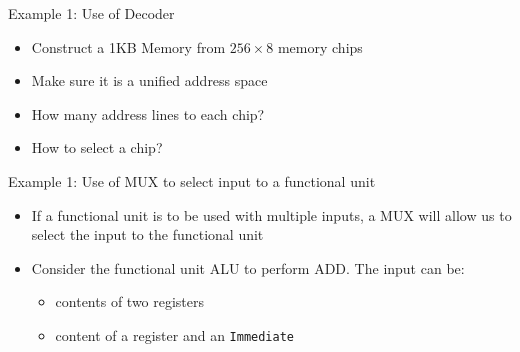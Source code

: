 \begin{frame}{Example 1: Use of Decoder}
    \begin{tcolorbox}[enhanced,attach boxed title to top center={yshift=-3mm,yshifttext=-1mm},
  colback=blue!5!white,colframe=blue!75!black,colbacktitle=blue!80!black,
  title=Think About It,fonttitle=\bfseries,
  boxed title style={size=small,colframe=red!50!black} ]
  \begin{itemize}
    \item Construct a 1KB Memory from $256 \times 8$ memory chips
        \item Make sure it is a unified address space 
    \item How many address lines to each chip?
    \item How to select a chip?
  \end{itemize}
\end{tcolorbox}
\end{frame}


\begin{frame}{Example 1: Use of MUX to select input to a functional unit}
    \begin{tcolorbox}[enhanced,attach boxed title to top center={yshift=-3mm,yshifttext=-1mm},
  colback=blue!5!white,colframe=blue!75!black,colbacktitle=blue!80!black,
  title=Think About It,fonttitle=\bfseries,
  boxed title style={size=small,colframe=red!50!black} ]
  \begin{itemize}
        \item If a functional unit is to be used with multiple inputs, a MUX will allow us to select the input to the functional unit
  \item Consider the functional unit ALU to perform ADD. The input can be:
  \begin{itemize}
      \item contents of two registers
  \item  content of a register and an \texttt{Immediate}
  \end{itemize}
  
  \end{itemize}
\end{tcolorbox}
\end{frame}

